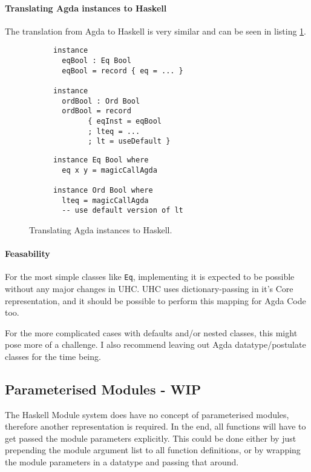 \documentclass[12pt, a4paper, twoside]{report}
\begin{document}
\paragraph{Translating Agda instances to Haskell}
The translation from Agda to Haskell is very similar and can be seen in listing \ref{lst:inst-agda-hs}.
\begin{figure}
\begin{subfigure}[b]{0.5\textwidth}
\begin{lstlisting}
instance
  eqBool : Eq Bool
  eqBool = record { eq = ... }

instance
  ordBool : Ord Bool
  ordBool = record
        { eqInst = eqBool
        ; lteq = ...
        ; lt = useDefault }
\end{lstlisting}
\end{subfigure}
\hspace{10pt}
\begin{subfigure}[b]{0.5\textwidth}
\begin{lstlisting}
instance Eq Bool where
  eq x y = magicCallAgda

instance Ord Bool where
  lteq = magicCallAgda
  -- use default version of lt
\end{lstlisting}
\end{subfigure}
\caption{Translating Agda instances to Haskell.}
\label{lst:inst-agda-hs}
\end{figure}


\paragraph{Feasability}
For the most simple classes like \texttt{Eq}, implementing it is expected to be
possible without any major changes in UHC. UHC uses dictionary-passing in it's Core representation,
and it should be possible to perform this mapping for Agda Code too.

For the more complicated cases with defaults and/or nested classes, this might pose more of a challenge.
I also recommend leaving out Agda datatype/postulate classes for the time being.

\subsection{Parameterised Modules - WIP}
The Haskell Module system does have no concept of parameterised modules, therefore another representation is required. In the end,
all functions will have to get passed the module parameters explicitly. This could be done either by just prepending the module
argument list to all function definitions, or by wrapping the module parameters in a datatype and passing that around.
\end{document}
